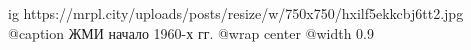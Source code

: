  
 
 
 
 

\ifcmt
  ig https://mrpl.city/uploads/posts/resize/w/750x750/hxilf5ekkcbj6tt2.jpg
	@caption ЖМИ начало 1960-х гг.
  @wrap center
  @width 0.9
\fi
